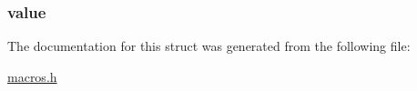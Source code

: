 \subsubsection[{value}]{ value}\label{struct_field___value_a2f14c1ab2c4449bdb44c2a134ad70787}


The documentation for this struct was generated from the following file\+:\begin{DoxyCompactItemize}
\item 
\hyperlink{macros_8h}{macros.\+h}\end{DoxyCompactItemize}
